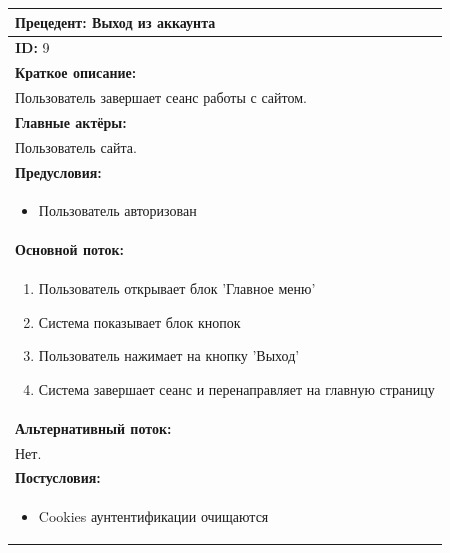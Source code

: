 \documentclass{scrreprt}
\begin{document}
\vspace{10px}
\noindent
\begin{tabularx}{\textwidth}{|X|}
	\hline
	\textbf{Прецедент: Выход из аккаунта} \\
	\hline
	\textbf{ID:} 9 \\
	\hline
	\textbf{Краткое описание:} \\
	Пользователь завершает сеанс работы с сайтом.\\
	\hline
	\textbf{Главные актёры:} \\
	Пользователь сайта. \\
	\hline
	\textbf{Предусловия:} \\
	\begin{itemize}[nosep,leftmargin=*]
		\item Пользователь авторизован 
	\end{itemize} \\
	\hline
	\textbf{Основной поток:} \\
	\begin{enumerate}[nosep,leftmargin=*]
		\item Пользователь открывает блок 'Главное меню'
		\item Система показывает блок кнопок
		\item Пользователь нажимает на кнопку 'Выход'
		\item Система завершает сеанс и перенаправляет на главную страницу
	\end{enumerate} \\
	\hline
	\textbf{Альтернативный поток:} \\
	Нет.\\
	\hline
	\textbf{Постусловия:} \\
	\begin{itemize}[nosep,leftmargin=*]
		\item Cookies аунтентификации очищаются
	\end{itemize} \\
	\hline
\end{tabularx}
\end{document}

